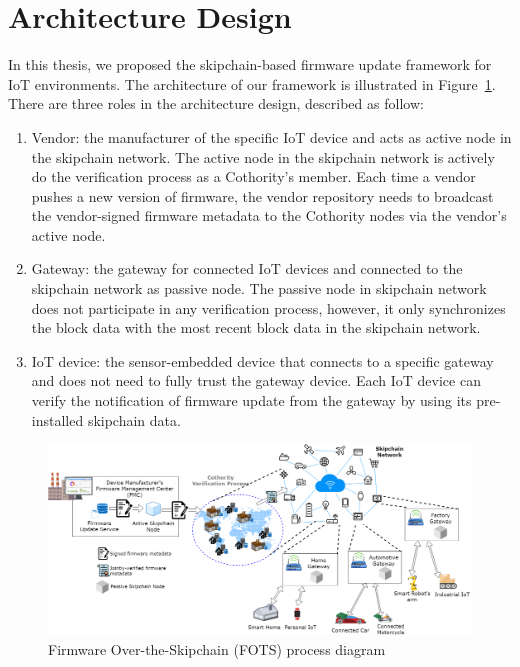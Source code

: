 \section{Architecture Design}
\label{sec:3_architectureDesign}

In this thesis, we proposed the skipchain-based firmware update framework for IoT environments. The architecture of our framework is illustrated in Figure~\ref{fig:1_fotb}. There are three roles in the architecture design, described as follow:
~\begin{enumerate}
	\item Vendor: the manufacturer of the specific IoT device and acts as active node in the skipchain network. The active node in the skipchain network is actively do the verification process as a Cothority's member. Each time a vendor pushes a new version of firmware, the vendor repository needs to broadcast the vendor-signed firmware metadata to the Cothority nodes via the vendor's active node.
	\item Gateway: the gateway for connected IoT devices and connected to the skipchain network as passive node. The passive node in skipchain network does not participate in any verification process, however, it only synchronizes the block data with the most recent block data in the skipchain network.
	\item IoT device: the sensor-embedded device that connects to a specific gateway and does not need to fully trust the gateway device. Each IoT device can verify the notification of firmware update from the gateway by using its pre-installed skipchain data.
\end{enumerate}

\begin{figure}[H]
	\begin{center}
		\includegraphics[width=1.0\textwidth]{figures/firmware_update-skipchain-based_fotb.png}
		\caption{Firmware Over-the-Skipchain (FOTS) process diagram} 
		\label{fig:1_fotb}
	\end{center}
\end{figure}

